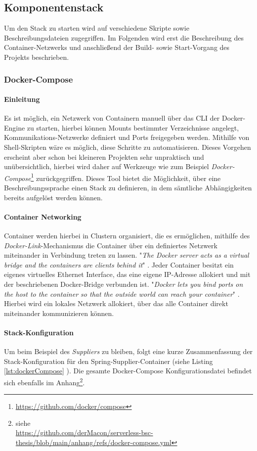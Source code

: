 \subsection{Komponentenstack}
Um den Stack zu starten wird auf verschiedene Skripte sowie Beschreibungsdateien zugegriffen. Im Folgenden wird erst die Beschreibung des Container-Netzwerks und anschließend der Build- sowie Start-Vorgang des Projekts beschrieben.

\subsubsection{Docker-Compose}
\paragraph{Einleitung}
Es ist möglich, ein Netzwerk von Containern manuell über das CLI der Docker-Engine zu starten, hierbei können Mounts bestimmter Verzeichnisse angelegt, Kommunikations-Netzwerke definiert und Ports freigegeben werden. Mithilfe von Shell-Skripten wäre es möglich, diese Schritte zu automatisieren. Dieses Vorgehen erscheint aber schon bei kleineren Projekten sehr unpraktisch und unübersichtlich, hierbei wird daher auf Werkzeuge wie zum Beispiel \emph{Docker-Compose}\footnote{\url{https://github.com/docker/compose}} zurückgegriffen. Dieses Tool bietet die Möglichkeit, über eine Beschreibungssprache einen Stack zu definieren, in dem sämtliche Abhängigkeiten bereits aufgelöst werden können. 

\paragraph{Container Networking}
Container werden hierbei in Clustern organisiert, die es ermöglichen, mithilfe des \emph{Docker-Link}-Mechanismus die Container über ein definiertes Netzwerk miteinander in Verbindung treten zu lassen. "\emph{The Docker server acts as a virtual bridge and the containers are clients behind it}" \cite[Seite~13]{oreilly-docker}. Jeder Container besitzt ein eigenes virtuelles Ethernet Interface, das eine eigene IP-Adresse allokiert und mit der beschriebenen Docker-Bridge verbunden ist. "\emph{Docker lets you bind ports on the host to the container so that the outside world can reach your container}" \cite{oreilly-docker}. Hierbei wird ein lokales Netzwerk allokiert, über das alle Container direkt miteinander kommunizieren können.

\paragraph{Stack-Konfiguration}
Um beim Beispiel des \emph{Suppliers} zu bleiben, folgt eine kurze Zusammenfassung der Stack-Konfiguration für den Spring-Supplier-Container (siehe Listing \ref{lst:dockerCompose} ). Die gesamte Docker-Compose Konfigurationsdatei befindet sich ebenfalls im Anhang\footnote{siehe \\ \url{https://github.com/derMacon/serverless-bsc-thesis/blob/main/anhang/refs/docker-compose.yml}}.

